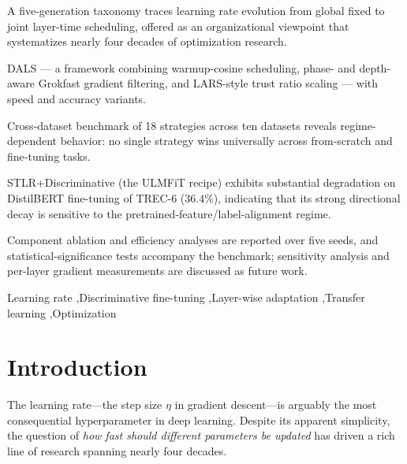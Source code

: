 \documentclass[a4paper,fleqn]{cas-dc}
\begin{document}
\begin{highlights}
\item A five-generation taxonomy traces learning rate evolution from global fixed to joint layer-time scheduling, offered as an organizational viewpoint that systematizes nearly four decades of optimization research.
\item DALS --- a framework combining warmup-cosine scheduling, phase- and depth-aware Grokfast gradient filtering, and LARS-style trust ratio scaling --- with speed and accuracy variants.
\item Cross-dataset benchmark of 18 strategies across ten datasets reveals regime-dependent behavior: no single strategy wins universally across from-scratch and fine-tuning tasks.
\item STLR+Discriminative (the ULMFiT recipe) exhibits substantial degradation on DistilBERT fine-tuning of TREC-6 (36.4\%), indicating that its strong directional decay is sensitive to the pretrained-feature/label-alignment regime.
\item Component ablation and efficiency analyses are reported over five seeds, and statistical-significance tests accompany the benchmark; sensitivity analysis and per-layer gradient measurements are discussed as future work.
\end{highlights}

\begin{keywords}
Learning rate \sep Discriminative fine-tuning \sep Layer-wise adaptation \sep Transfer learning \sep Optimization
\end{keywords}

\maketitle

\section{Introduction}\label{sec:intro}

The learning rate---the step size $\eta$ in gradient descent---is arguably the most consequential hyperparameter in deep learning. Despite its apparent simplicity, the question of \emph{how fast should different parameters be updated} has driven a rich line of research spanning nearly four decades.
\end{document}
